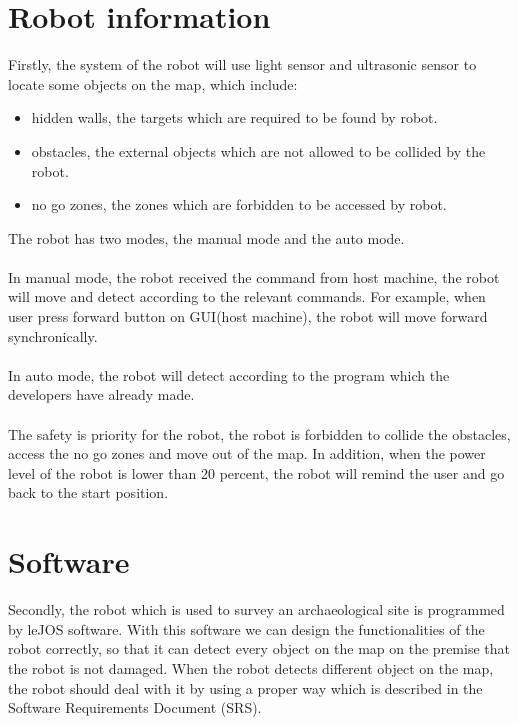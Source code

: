 \documentclass[11pt, a4paper]{report}
\begin{document}
\section{Robot information}
 Firstly, the system of the robot will use light sensor and ultrasonic sensor to locate some objects on the map, which include:
\begin{itemize}
  \item hidden walls, the targets which are required to be found by robot.  
  \item obstacles, the external objects which are not allowed to be collided by the robot.
  \item no go zones, the zones which are forbidden to be accessed by robot.
\end{itemize}
The robot has two modes, the manual mode and the auto mode. \\ \\
In manual mode, the robot received the command from host machine, the robot will move and detect according to the relevant commands. For example, when user press forward button on GUI(host machine), the robot will move forward synchronically.\\ \\
In auto mode, the robot will detect according to the program which the developers have already made.\\ \\
The safety is priority for the robot, the robot is forbidden to collide the obstacles, access the no go zones and move out of the map. In addition, when the power level of the robot is lower than 20 percent, the robot will remind the user and go back to the start position.     
\par\vspace{\baselineskip}
\par\vspace{\baselineskip}
\section{Software}
Secondly, the robot which is used to survey an archaeological site is programmed by leJOS software. With this software we can design the functionalities of the robot correctly, so that it can detect every object on the map on the premise that the robot is not damaged. When the robot detects different object on the map, the robot should deal with it by using a proper way which is described in the Software Requirements Document (SRS).
\par\vspace{\baselineskip}
\par\vspace{\baselineskip}
\end{document}
